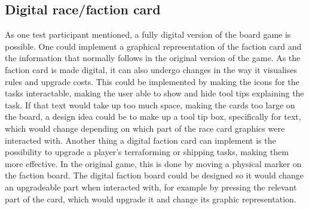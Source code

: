 \subsection{Digital race/faction card}\label{sec:DigiRaceFact}
As one test participant mentioned, a fully digital version of the board game is possible. One could implement a graphical representation of the faction card and the information that normally follows in the original version of the game. As the faction card is made digital, it can also undergo changes in the way it visualises rules and upgrade costs. This could be implemented by making the icons for the tasks interactable, making the user able to show and hide tool tips explaining the task. If that text would take up too much space, making the cards too large on the board, a design idea could be to make up a tool tip box, specifically for text, which would change depending on which part of the race card graphics were interacted with. Another thing a digital faction card can implement is the possibility to upgrade a player's terraforming or shipping tasks, making them more effective. In the original game, this is done by moving a physical marker on the faction board. The digital faction board could be designed so it would change an upgradeable part when interacted with, for example by pressing the relevant part of the card, which would upgrade it and change its graphic representation.

